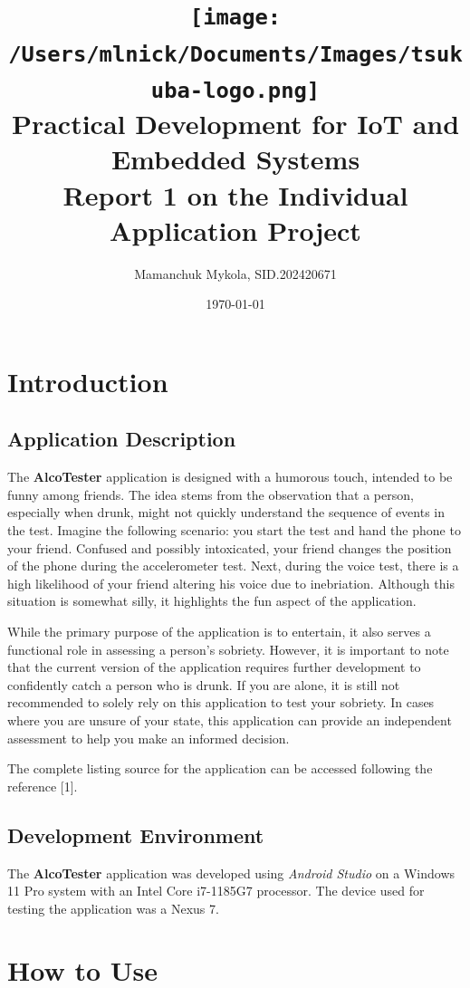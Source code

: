 \documentclass[12pt,a4paper]{article}
\title{
    \texttt{[image: /Users/mlnick/Documents/Images/tsukuba-logo.png]} \\
    \vspace{3mm}  
    \textbf{Practical Development for IoT and Embedded Systems} \\
    \vspace{3mm}    
    Report 1 on the Individual Application Project
}
\author{Mamanchuk Mykola, SID.202420671}
\date{\today}
\begin{document}
\maketitle

\section{Introduction}

\subsection{Application Description}

The \textbf{AlcoTester} application is designed with a humorous touch, intended to be funny among friends. The idea stems from the observation that a person, especially when drunk, might not quickly understand the sequence of events in the test. Imagine the following scenario: you start the test and hand the phone to your friend. Confused and possibly intoxicated, your friend changes the position of the phone during the accelerometer test. Next, during the voice test, there is a high likelihood of your friend altering his voice due to inebriation. Although this situation is somewhat silly, it highlights the fun aspect of the application.

While the primary purpose of the application is to entertain, it also serves a functional role in assessing a person's sobriety. However, it is important to note that the current version of the application requires further development to confidently catch a person who is drunk. If you are alone, it is still not recommended to solely rely on this application to test your sobriety. In cases where you are unsure of your state, this application can provide an independent assessment to help you make an informed decision.

The complete listing source for the application can be accessed following the reference [1].

\subsection{Development Environment}
The \textbf{AlcoTester} application was developed using \textit{Android Studio} on a Windows 11 Pro system with an Intel Core i7-1185G7 processor. The device used for testing the application was a Nexus 7.

\section{How to Use}
\end{document}

